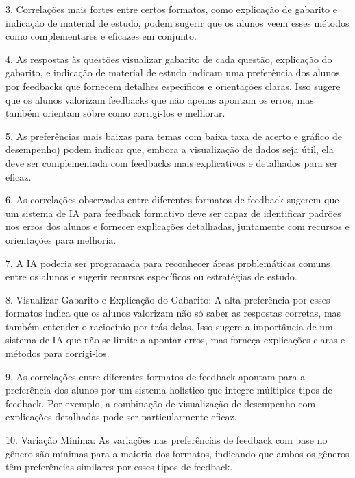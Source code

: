 3. Correlações mais fortes entre certos formatos, como explicação de gabarito e indicação de material de estudo, podem sugerir que os alunos veem esses métodos como complementares e eficazes em conjunto.

4. As respostas às questões visualizar gabarito de cada questão, explicação do gabarito, e indicação de material de estudo indicam uma preferência dos alunos por feedbacks que fornecem detalhes específicos e orientações claras. Isso sugere que os alunos valorizam feedbacks que não apenas apontam os erros, mas também orientam sobre como corrigi-los e melhorar.

5. As preferências mais baixas para temas com baixa taxa de acerto e gráfico de desempenho) podem indicar que, embora a visualização de dados seja útil, ela deve ser complementada com feedbacks mais explicativos e detalhados para ser eficaz.

6. As correlações observadas entre diferentes formatos de feedback sugerem que um sistema de IA para feedback formativo deve ser capaz de identificar padrões nos erros dos alunos e fornecer explicações detalhadas, juntamente com recursos e orientações para melhoria.

7. A IA poderia ser programada para reconhecer áreas problemáticas comuns entre os alunos e sugerir recursos específicos ou estratégias de estudo.

8. Visualizar Gabarito e Explicação do Gabarito: A alta preferência por esses formatos indica que os alunos valorizam não só saber as respostas corretas, mas também entender o raciocínio por trás delas. Isso sugere a importância de um sistema de IA que não se limite a apontar erros, mas forneça explicações claras e métodos para corrigi-los.

9. As correlações entre diferentes formatos de feedback apontam para a preferência dos alunos por um sistema holístico que integre múltiplos tipos de feedback. Por exemplo, a combinação de visualização de desempenho com explicações detalhadas pode ser particularmente eficaz.

10. Variação Mínima: As variações nas preferências de feedback com base no gênero são mínimas para a maioria dos formatos, indicando que ambos os gêneros têm preferências similares por esses tipos de feedback.

